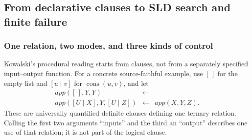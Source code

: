 
\subsection{From declarative clauses to SLD search and finite failure}
\label{sec:p09-presentation-n-c-022}

\subsubsection{One relation, two modes, and three kinds of control}

Kowalski's procedural reading starts from clauses, not from a separately
specified input--output function.  For a concrete source-faithful example, use
\([\,]\) for the empty list and \([u\mid v]\) for
\(\operatorname{cons}(u,v)\), and let
\[
\begin{array}{rcl}
 \mathit{app}([\,],Y,Y)&\leftarrow&\\
 \mathit{app}([U\mid X],Y,[U\mid Z])
   &\leftarrow&\mathit{app}(X,Y,Z).
\end{array}
\]
These are universally quantified definite clauses defining one ternary
relation.  Calling the first two arguments \enquote{inputs} and the third an
\enquote{output} describes one use of that relation; it is not part of the
logical clause.

